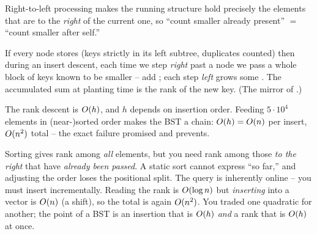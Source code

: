 \begin{observation}
Right-to-left processing makes the running structure hold precisely the elements that are to the
\emph{right} of the current one, so ``count smaller already present'' $=$ ``count smaller after self.''
\end{observation}
\begin{observation}
If every node stores  (keys strictly in its left subtree, duplicates counted) then
during an insert descent, each time we step \emph{right} past a node we pass a whole block of keys
known to be smaller -- add ; each step \emph{left} grows some . The
accumulated sum at planting time is the rank of the new key. (The mirror of .)
\end{observation}
\begin{observation}
The rank descent is $O(h)$, and $h$ depends on insertion order. Feeding $5\cdot10^{4}$ elements
in (near-)sorted order makes the BST a chain: $O(h)=O(n)$ per insert, $O(n^2)$ total --
the exact failure  promised and  prevents.
\end{observation}

\begin{thinkbox}
{Sorting gives rank among \emph{all} elements, but you need rank among those \emph{to the right} that
have \emph{already been passed}. A static sort cannot express ``so far,'' and adjusting the order
loses the positional split. The query is inherently online -- you must insert incrementally.}
{Reading the rank is $O(\log n)$ but \emph{inserting} into a vector is $O(n)$ (a shift), so the
total is again $O(n^2)$. You traded one quadratic for another; the point of a BST is an insertion
that is $O(h)$ \emph{and} a rank that is $O(h)$ at once.}
\end{thinkbox}

